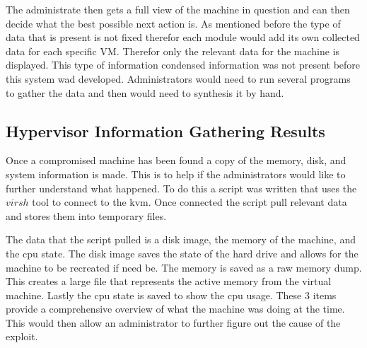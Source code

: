 \documentclass[12pt]{article}
\begin{document}
The administrate then gets a full view of the machine in question and can then decide what the best possible next action is. As mentioned before the type of data that is present is not fixed therefor each module would add its own collected data for each specific VM. Therefor only the relevant data for the machine is displayed. This type of information condensed information was not present before this system wad developed. Administrators would need to run several programs to gather the data and then would need to synthesis it by hand.

\subsection{Hypervisor Information Gathering Results}
Once a compromised machine has been found a copy of the memory, disk, and system information is made. This is to help if the administrators would like to further understand what happened. To do this a script was written that uses the $virsh$ tool to connect to the kvm. Once connected the script pull relevant data and stores them into temporary files.

The data that the script pulled is a disk image, the memory of the machine, and the cpu state. The disk image saves the state of the hard drive and allows for the machine to be recreated if need be. The memory is saved as a raw memory dump. This creates a large file that represents the active memory from the virtual machine. Lastly the cpu state is saved to show the cpu usage. These 3 items provide a comprehensive overview of what the machine was doing at the time. This would then allow an administrator to further figure out the cause of the exploit.
\end{document}
